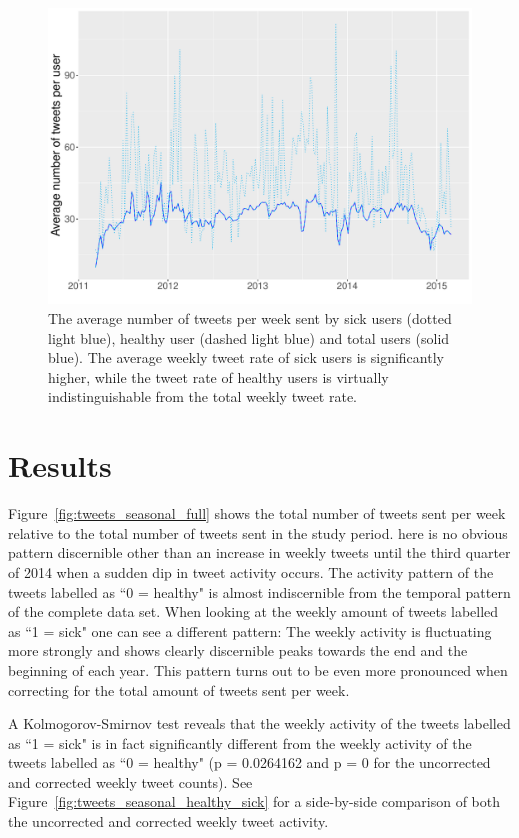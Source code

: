 \documentclass[11pt, a4paper]{report}\usepackage[]{graphicx}\usepackage[]{color}
\begin{document}
\begin{figure}[H]
\centering
\includegraphics[width=1\linewidth]{avg_tw_sick_healthy.pdf}
\caption{The average number of tweets per week sent by sick users (dotted light blue), healthy user (dashed light blue) and total users (solid blue). The average weekly tweet rate of sick users is significantly higher, while the tweet rate of healthy users is virtually indistinguishable from the total weekly tweet rate.}
\label{fig:avg_tw_diff}
\end{figure}

\chapter{Results}
\label{ch:results}
Figure~\ref{fig:tweets_seasonal_full} shows the total number of tweets sent per week relative to the total number of tweets sent in the study period. here is no obvious pattern discernible other than an increase in weekly tweets until the third quarter of 2014 when a sudden dip in tweet activity occurs. The activity pattern of the tweets labelled as ``0 = healthy" is almost indiscernible from the temporal pattern of the complete data set. When looking at the weekly amount of tweets labelled as ``1 = sick" one can see a different pattern: The weekly activity is fluctuating more strongly and shows clearly discernible peaks towards the end and the beginning of each year. This pattern turns out to be even more pronounced when correcting for the total amount of tweets sent per week.\newline

A Kolmogorov-Smirnov test reveals that the weekly activity of the tweets labelled as ``1 = sick" is in fact significantly different from the weekly activity of the tweets labelled as ``0 = healthy" (p = 0.0264162 and p = 0 for the uncorrected and corrected weekly tweet counts). See Figure~\ref{fig:tweets_seasonal_healthy_sick} for a side-by-side comparison of both the uncorrected and corrected weekly tweet activity.\newline
\end{document}
